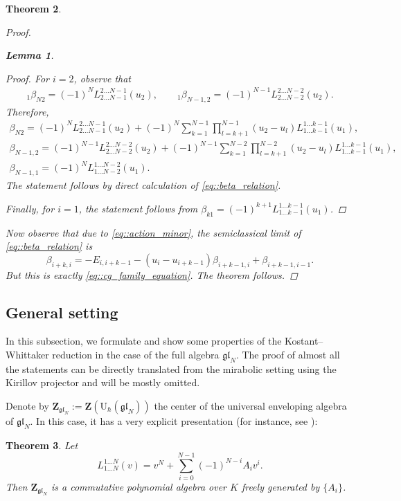 \documentclass[10pt,a4paper]{article}
\numberwithin{equation}{section}
\newtheorem{Theorem}{Theorem}[section]
\newtheorem{Lemma}[Theorem]{Lemma}
\newcommand{\U}{\mathrm{U}_{\hbar}}
\newcommand{\Z}{\mathbf{Z}}
\newcommand{\gl}{\mathfrak{gl}}
\begin{document}
\begin{Theorem}
\begin{proof}
\begin{Lemma}
\begin{proof}
					For $i=2$, observe that
					\begin{align*}
						{}_1\beta_{N2} = (-1)^{N} L_{2\dots N-1}^{2\dots N-1}(u_2), \qquad
						{}_1 \beta_{N-1,2} = (-1)^{N-1} L_{2\dots N-2}^{2\dots N-2}(u_2).
					\end{align*}
					Therefore,
					\begin{gather*}
						\beta_{N2} = (-1)^{N} L_{2\dots N-1}^{2\dots N-1}(u_2) + (-1)^{N} \sum\limits_{k=1}^{N-1} \prod_{l=k+1}^{N-1} (u_2 - u_{l}) L_{1\dots k-1}^{1\dots k-1}(u_1), \\
						\beta_{N-1,2} = (-1)^{N-1} L_{2\dots N-2}^{2\dots N-2}(u_2) + (-1)^{N-1} \sum\limits_{k=1}^{N-2} \prod_{l=k+1}^{N-2} (u_2 - u_{l}) L_{1\dots k-1}^{1\dots k-1}(u_1),\\
						\beta_{N-1,1} = (-1)^{N} L_{1\dots N-2}^{1\dots N-2}(u_1).
					\end{gather*}
					The statement follows by direct calculation of \eqref{eq::beta_relation}.
					
					Finally, for $i=1$, the statement follows from $
					\beta_{k1} = (-1)^{k+1} L_{1\dots k-1}^{1\dots k-1}(u_1)$.
				\end{proof}
			\end{Lemma}
			
			Now observe that due to \eqref{eq::action_minor}, the semiclassical limit of \eqref{eq::beta_relation} is
			\[
			\beta_{i+k,i} = -E_{i,i+k-1} - (u_i - u_{i+k-1}) \beta_{i+k-1,i} + \beta_{i+k-1,i-1}.
			\]
			But this is exactly \eqref{eq::cg_family_equation}. The theorem follows.
		\end{proof}
	\end{Theorem}
	
	
	\subsection{General setting} In this subsection, we formulate and show some properties of the Kostant--Whittaker reduction in the case of the full algebra $\gl_N$. The proof of almost all the statements can be directly translated from the mirabolic setting using the Kirillov projector and will be mostly omitted.
	
	Denote by $\Z_{\gl_N}:= \Z(\U(\gl_N))$ the center of the universal enveloping algebra of $\gl_N$. In this case, it has a very explicit presentation (for instance, see \cite{MolevNazarovOlshanskii}):
	\begin{Theorem}
		\label{thm::center}
		Let
		\[
		L_{1\dots N}^{1\dots N}(v) = v^N + \sum\limits_{i=0}^{N-1} (-1)^{N-i} A_i v^i.
		\]
		Then $\Z_{\gl_N}$ is a commutative polynomial algebra over $K$ freely generated by $\{A_i\}$.
	\end{Theorem}
	
\end{document}
